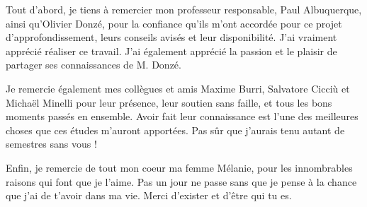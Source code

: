 \begin{acknowledgements}
\addchaptertocentry{\acknowledgementname} %
Tout d'abord, je tiens à remercier mon professeur responsable, Paul Albuquerque, ainsi qu'Olivier Donzé, pour la confiance qu'ils m'ont accordée pour ce projet d'approfondissement, leurs conseils avisés et leur disponibilité. J'ai vraiment apprécié réaliser ce travail. J'ai également apprécié  la passion et le plaisir de partager ses connaissances de M. Donzé.

Je remercie également mes collègues et amis Maxime Burri, Salvatore Cicciù et Michaël Minelli pour leur présence, leur soutien sans faille, et tous les bons moments passés en ensemble. Avoir fait leur connaissance est l'une des meilleures choses que ces études m'auront apportées. Pas sûr que j'aurais tenu autant de semestres sans vous !

Enfin, je remercie de tout mon coeur ma femme Mélanie, pour les innombrables raisons qui font que je l'aime. Pas un jour ne passe sans que je pense à la chance que j'ai de t'avoir dans ma vie. Merci d'exister et d'être qui tu es.

\end{acknowledgements}